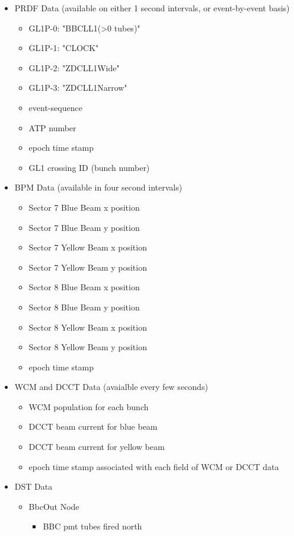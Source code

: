 \begin{itemize}
\item PRDF Data (available on either 1 second intervals, or event-by-event basis)
  \begin{itemize}
  \item GL1P-0: "BBCLL1(\textgreater0 tubes)"
  \item GL1P-1: "CLOCK"
  \item GL1P-2: "ZDCLL1Wide"
  \item GL1P-3: "ZDCLL1Narrow"
  \item event-sequence
  \item ATP number
  \item epoch time stamp
  \item GL1 crossing ID (bunch number)
  \end{itemize}
\item BPM Data (available in four second intervals)
  \begin{itemize}
  \item Sector 7 Blue Beam x position
  \item Sector 7 Blue Beam y position
  \item Sector 7 Yellow Beam x position
  \item Sector 7 Yellow Beam y position
  \item Sector 8 Blue Beam x position
  \item Sector 8 Blue Beam y position
  \item Sector 8 Yellow Beam x position
  \item Sector 8 Yellow Beam y position
  \item epoch time stamp
  \end{itemize}
\item WCM and DCCT Data (avaialble every few seconds)
  \begin{itemize}
  \item WCM population for each bunch
  \item DCCT beam current for blue beam
  \item DCCT beam current for yellow beam
  \item epoch time stamp associated with each field of WCM or DCCT data
  \end{itemize}
\item DST Data
  \begin{itemize}
  \item BbcOut Node
    \begin{itemize}
      \item BBC pmt tubes fired north

\end{itemize}
\end{itemize}
\end{itemize}
